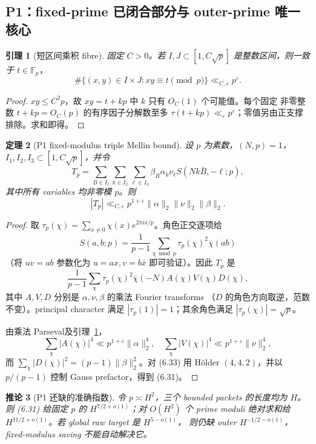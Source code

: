 \documentclass[11pt,a4paper]{ctexart}
\newtheorem{theorem}{定理}[section]
\newtheorem{lemma}[theorem]{引理}
\newtheorem{corollary}[theorem]{推论}
\theoremstyle{definition}
\newcommand{\1}{\mathbf 1}
\begin{document}
\subsection{P1：fixed-prime 已闭合部分与 outer-prime 唯一核心}

\begin{lemma}[短区间乘积 fibre]\label{lem:product-fibre}
固定 $C>0$。若 $I,J\subset[1,C\sqrt p]$ 是整数区间，则一致于
$t\in\mathbb F_p$，
\[
\#\{(x,y)\in I\times J:xy\equiv t\pmod p\}\ll_{C,\varepsilon}p^\varepsilon.
\tag{6.29}
\]
\end{lemma}

\begin{proof}
$xy\le C^2p$，故 $xy=t+kp$ 中 $k$ 只有 $O_C(1)$ 个可能值。每个固定
非零整数 $t+kp=O_C(p)$ 的有序因子分解数至多 $\tau(t+kp)\ll_\varepsilon
p^\varepsilon$；零值另由正支撑排除。求和即得。
\end{proof}

\begin{theorem}[P1 fixed-modulus triple Mellin bound]\label{thm:p1fixed}
设 $p$ 为素数，$(N,p)=1$，$I_1,I_2,I_3\subset[1,C\sqrt p]$，并令
\[
T_p=\sum_{B\in I_1}\sum_{k\in I_2}\sum_{\ell\in I_3}
\beta_B\alpha_k\nu_\ell S(Nk\bar B,-\ell;p),         \tag{6.30}
\]
其中所有 variables 均非零模 $p$。则
\[
\boxed{|T_p|\ll_{C,\varepsilon}p^{1+\varepsilon}
\|\alpha\|_2\|\nu\|_2\|\beta\|_2.}               \tag{6.31}
\]
\end{theorem}

\begin{proof}
取 $\tau_p(\chi)=\sum_{x\ne0}\chi(x)e^{2\pi ix/p}$。角色正交逐项给
\[
S(a,b;p)=\frac1{p-1}\sum_{\chi\bmod p}
\tau_p(\chi)^2\overline\chi(ab)                      \tag{6.32}
\]
（将 $uv=ab$ 参数化为 $u=ax,v=b\bar x$ 即可验证）。因此 $T_p$ 是
\[
\frac1{p-1}\sum_\chi\tau_p(\chi)^2\overline\chi(-N)
A(\chi)V(\chi)D(\chi),                               \tag{6.33}
\]
其中 $A,V,D$ 分别是 $\alpha,\nu,\beta$ 的乘法 Fourier transforms
（$D$ 的角色方向取逆，范数不变）。principal character 满足
$|\tau_p(1)|=1$；其余角色满足 $|\tau_p(\chi)|=\sqrt p$。

由乘法 Parseval及引理~\ref{lem:product-fibre}，
\[
\sum_\chi|A(\chi)|^4\ll p^{1+\varepsilon}\|\alpha\|_2^4,
\quad
\sum_\chi|V(\chi)|^4\ll p^{1+\varepsilon}\|\nu\|_2^4,              \tag{6.34}
\]
而 $\sum_\chi|D(\chi)|^2=(p-1)\|\beta\|_2^2$。对 (6.33) 用
Hölder $(4,4,2)$，并以 $p/(p-1)$ 控制 Gauss prefactor，得到 (6.31)。
\end{proof}

\begin{corollary}[P1 还缺的准确指数]
令 $p\asymp H^2$，三个 bounded packets 的长度均为 $H$。则
(6.31) 给固定 $p$ 的 $H^{7/2+o(1)}$；对 $O(H^2)$ 个 prime moduli
绝对求和给 $H^{11/2+o(1)}$。若 global raw target 是 $H^{5-o(1)}$，
则仍缺 outer $H^{-1/2-o(1)}$，fixed-modulus saving 不能自动解决它。
\end{corollary}
\end{document}
